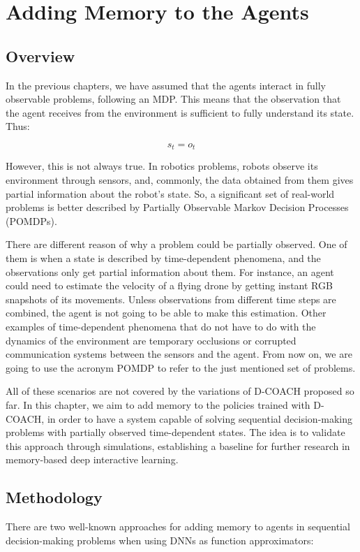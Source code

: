 \chapter{Adding Memory to the Agents}
\section{Overview}
In the previous chapters, we have assumed that the agents interact in fully observable problems, following an MDP. This means that the observation that the agent receives from the environment is sufficient to fully understand its state. Thus:

\begin{equation}
    s_{t} = o_{t}
\end{equation}

However, this is not always true. In robotics problems, robots observe its environment through sensors, and, commonly, the data obtained from them gives partial information about the robot's state. So, a significant set of real-world problems is better described by Partially Observable Markov Decision Processes (POMDPs).

There are different reason of why a problem could be partially observed. One of them is when a state is described by time-dependent phenomena, and the observations only get partial information about them. For instance, an agent could need to estimate the velocity of a flying drone by getting instant RGB snapshots of its movements. Unless observations from different time steps are combined, the agent is not going to be able to make this estimation. Other examples of time-dependent phenomena that do not have to do with the dynamics of the environment are temporary occlusions or corrupted communication systems between the sensors and the agent. From now on, we are going to use the acronym POMDP to refer to the just mentioned set of problems.

All of these scenarios are not covered by the variations of D-COACH proposed so far. In this chapter, we aim to add memory to the policies trained with D-COACH, in order to have a system capable of solving sequential decision-making problems with partially observed time-dependent states. The idea is to validate this approach through simulations, establishing a baseline for further research in memory-based deep interactive learning.
\newpage

\section{Methodology}
There are two well-known approaches for adding memory to agents in sequential decision-making problems when using DNNs as function approximators:

